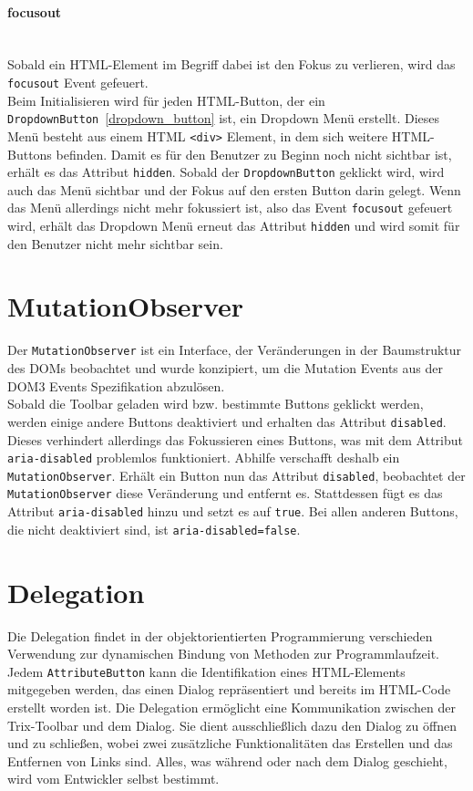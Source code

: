 \paragraph{focusout}\mbox{}\\
Sobald ein HTML-Element im Begriff dabei ist den Fokus zu verlieren, wird das \texttt{focusout} Event gefeuert.\\
Beim Initialisieren wird für jeden HTML-Button, der ein \texttt{DropdownButton}~\ref{dropdown_button} ist,  ein Dropdown Menü erstellt. Dieses Menü besteht aus einem HTML  \texttt{<div>} Element, in dem sich weitere HTML-Buttons befinden. Damit es für den Benutzer zu Beginn noch nicht sichtbar ist, erhält es das Attribut \texttt{hidden}. Sobald der \texttt{DropdownButton} geklickt wird, wird auch das Menü sichtbar und der Fokus auf den ersten Button darin gelegt. Wenn das Menü allerdings nicht mehr fokussiert ist, also das Event \texttt{focusout} gefeuert wird, erhält das Dropdown Menü erneut das Attribut \texttt{hidden} und wird somit für den Benutzer nicht mehr sichtbar sein.

\section{MutationObserver}
Der \texttt{MutationObserver} ist ein Interface, der Veränderungen in der Baumstruktur des DOMs beobachtet und wurde konzipiert, um die Mutation Events aus der DOM3 Events Spezifikation abzulösen.\\
Sobald die Toolbar geladen wird bzw. bestimmte Buttons geklickt werden, werden einige andere Buttons deaktiviert und erhalten das Attribut \texttt{disabled}. Dieses verhindert allerdings das Fokussieren eines Buttons, was mit dem Attribut \texttt{aria-disabled} problemlos funktioniert. Abhilfe verschafft deshalb ein \texttt{MutationObserver}. Erhält ein Button nun das Attribut \texttt{disabled}, beobachtet der \texttt{MutationObserver} diese Veränderung und entfernt es. Stattdessen fügt es das Attribut \texttt{aria-disabled} hinzu und setzt es auf \texttt{true}. Bei allen anderen Buttons, die nicht deaktiviert sind, ist \texttt{aria-disabled=false}.

\section{Delegation}
Die Delegation findet in der objektorientierten Programmierung verschieden Verwendung zur dynamischen Bindung von Methoden zur Programmlaufzeit.\\
Jedem \texttt{AttributeButton} kann die Identifikation eines HTML-Elements mitgegeben werden, das einen Dialog repräsentiert und bereits im HTML-Code erstellt worden ist. Die Delegation ermöglicht eine Kommunikation zwischen der Trix-Toolbar und dem Dialog. Sie dient ausschließlich dazu den Dialog zu öffnen und zu schließen, wobei zwei zusätzliche Funktionalitäten das Erstellen und das Entfernen von Links sind. Alles, was während oder nach dem Dialog geschieht, wird vom Entwickler selbst bestimmt.

